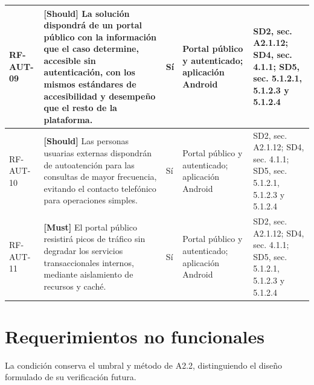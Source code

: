 \begin{paginaHorizontalSynaptix}
\begin{longtable}{|L{0.09\AnchoMatrizTDoce}|L{0.385\AnchoMatrizTDoce}|L{0.065\AnchoMatrizTDoce}|L{0.18\AnchoMatrizTDoce}|L{0.28\AnchoMatrizTDoce}|}
RF-\allowbreak{}AUT-\allowbreak{}09 &
\textbf{[Should]} La solución dispondrá de un portal público con la información que el caso determine, accesible sin autenticación, con los mismos estándares de accesibilidad y desempeño que el resto de la plataforma. &
Sí &
Portal público y autenticado; aplicación Android &
SD2, sec. A2.1.12; SD4, sec. 4.1.1; SD5, sec. 5.1.2.1, 5.1.2.3 y 5.1.2.4 \\ \hline

RF-\allowbreak{}AUT-\allowbreak{}10 &
\textbf{[Should]} Las personas usuarias externas dispondrán de autoatención para las consultas de mayor frecuencia, evitando el contacto telefónico para operaciones simples. &
Sí &
Portal público y autenticado; aplicación Android &
SD2, sec. A2.1.12; SD4, sec. 4.1.1; SD5, sec. 5.1.2.1, 5.1.2.3 y 5.1.2.4 \\ \hline

RF-\allowbreak{}AUT-\allowbreak{}11 &
\textbf{[Must]} El portal público resistirá picos de tráfico sin degradar los servicios transaccionales internos, mediante aislamiento de recursos y caché. &
Sí &
Portal público y autenticado; aplicación Android &
SD2, sec. A2.1.12; SD4, sec. 4.1.1; SD5, sec. 5.1.2.1, 5.1.2.3 y 5.1.2.4 \\ \hline
\end{longtable}


\clearpage
\section*{Requerimientos no funcionales}
La condición conserva el umbral y método de A2.2, distinguiendo el diseño formulado de su verificación futura.

\end{paginaHorizontalSynaptix}
